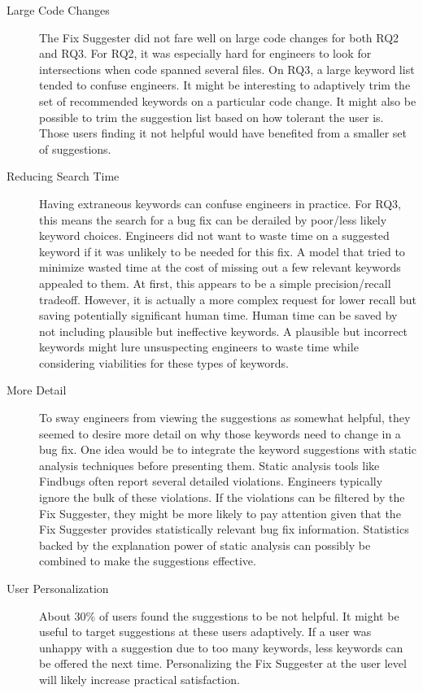 \documentclass[conference]{IEEEtran}
\begin{document}
\begin{description}
	\item[Large Code Changes] The Fix Suggester did not fare well on large code changes for both RQ2 and RQ3. For RQ2, it was especially hard for engineers to look for intersections when code spanned several files. On RQ3, a large keyword list tended to confuse engineers. It might be interesting to adaptively trim the set of recommended keywords on a particular code change. It might also be possible to trim the suggestion list based on how tolerant the user is. Those users finding it not helpful would have benefited from a smaller set of suggestions.
	\item[Reducing Search Time] Having extraneous keywords can confuse engineers in practice. For RQ3, this means the search for a bug fix can be derailed by poor/less likely keyword choices. Engineers did not want to waste time on a suggested keyword if it was unlikely to be needed for this fix. A model that tried to minimize wasted time at the cost of missing out a few relevant keywords appealed to them. At first, this appears to be a simple precision/recall tradeoff. However, it is actually a more complex request for lower recall but saving potentially significant human time. Human time can be saved by not including plausible but ineffective keywords. A plausible but incorrect keywords might lure unsuspecting engineers to waste time while considering viabilities for these types of keywords.
	\item[More Detail] To sway engineers from viewing the suggestions as somewhat helpful, they seemed to desire more detail on why those keywords need to change in a bug fix. One idea would be to integrate the keyword suggestions with static analysis techniques before presenting them. Static analysis tools like Findbugs often report several detailed violations. Engineers typically ignore the bulk of these violations. If the violations can be filtered by the Fix Suggester, they might be more likely to pay attention given that the Fix Suggester provides statistically relevant bug fix information. Statistics backed by the explanation power of static analysis can possibly be combined to make the suggestions effective.
	\item[User Personalization] About 30\% of users found the suggestions to be not helpful. It might be useful to target suggestions at these users adaptively. If a user was unhappy with a suggestion due to too many keywords, less keywords can be offered the next time. Personalizing the Fix Suggester at the user level will likely increase practical satisfaction.
	
\end{description}
\end{document}
